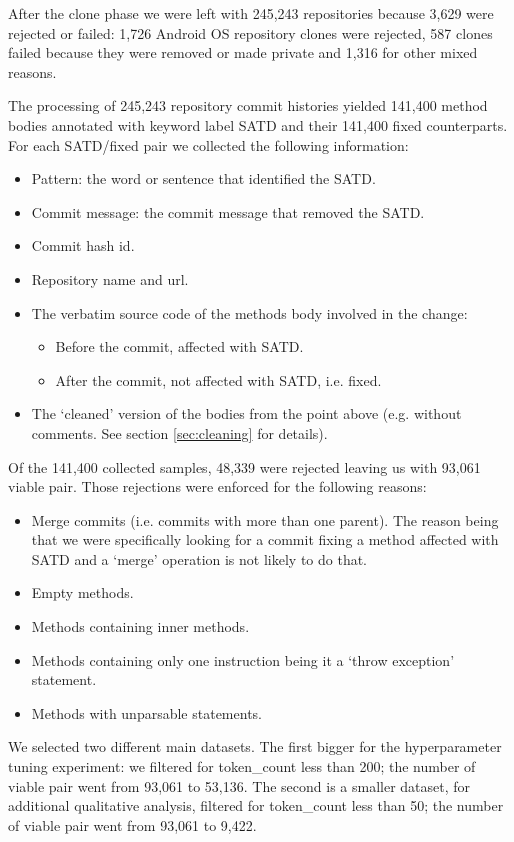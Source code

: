 After the clone phase we were left with 245,243 repositories because 3,629 were rejected or failed: 1,726 Android OS repository clones were rejected, 587 clones failed because they were removed or made private and 1,316 for other mixed reasons.

The processing of 245,243 repository commit histories yielded 141,400 method bodies annotated with keyword label SATD and their 141,400 fixed counterparts. For each SATD/fixed pair we collected the following information:
\begin{itemize}
    \item Pattern: the word or sentence that identified the SATD.
    \item Commit message: the commit message that removed the SATD.
    \item Commit hash id.
    \item Repository name and url.
    \item The verbatim source code of the methods body involved in the change: 
    \begin{itemize}
    \item Before the commit, affected with SATD. 
    \item After the commit, not affected with SATD, i.e. fixed.
    \end{itemize}
\item The `cleaned' version of the bodies from the point above (e.g. without comments. See section \ref{sec:cleaning} for details).
\end{itemize}

Of the 141,400 collected samples, 48,339 were rejected leaving us with 93,061 viable pair. Those rejections were enforced for the following reasons:
\begin{itemize}
    \item Merge commits (i.e. commits with more than one parent). The reason being that we were specifically looking for a commit fixing a method affected with SATD and a `merge' operation is not likely to do that.
    \item Empty methods.
    \item Methods containing inner methods.
    \item Methods containing only one instruction being it a `throw exception' statement.
    \item Methods with unparsable statements.
\end{itemize}

We selected two different main datasets. The first bigger for the hyperparameter tuning experiment: we filtered for token\_count less than 200; the number of viable pair went from 93,061 to 53,136. The second is a smaller dataset, for additional qualitative analysis, filtered for token\_count less than 50; the number of viable pair went from 93,061 to 9,422.
% 

